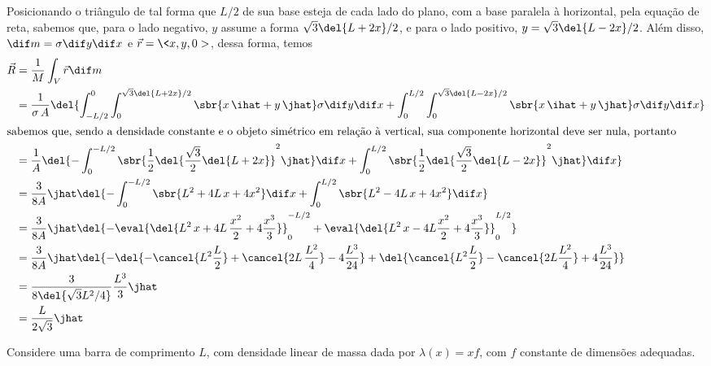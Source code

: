\documentclass[]{IMTexam}
\begin{document}
\begin{questions}
\begin{solution}
		Posicionando o triângulo de tal forma que $ L/2 $ de sua base esteja de cada lado do plano, com a base paralela à horizontal, pela equação de reta, sabemos que, para o lado negativo, $ y $ assume a forma $ \sqrt{3}\del{L+2x}/2 $, e para o lado positivo, $ y=\sqrt{3}\del{L-2x}/2 $. Além disso, $ \dif m=\sigma \dif y\dif x $ e $ \vec{r}=\<x,y,0> $, dessa forma, temos
		\begin{align*}
			\vec{R} & =\dfrac{1}{M}\int_{V}\vec{r}\dif m                                                                                                                                                                        \\
			        & =\dfrac{1}{\sigma\,A}\del{\int_{-L/2}^{0}\int_{0}^{\sqrt{3}\del{L+2x}/2}\sbr{x\,\ihat+y\,\jhat}\sigma\dif y\dif x+\int_{0}^{L/2}\int_{0}^{\sqrt{3}\del{L-2x}/2}\sbr{x\,\ihat+y\,\jhat}\sigma\dif y\dif x} \\
			\intertext{sabemos que, sendo a densidade constante e o objeto simétrico em relação à vertical, sua componente horizontal deve ser nula, portanto}
			        & =\dfrac{1}{A}\del{-\int_{0}^{-L/2}\sbr{\dfrac{1}{2}\del{\dfrac{\sqrt{3}}{2}\del{L+2x}}^{2}\jhat}\dif x+\int_{0}^{L/2}\sbr{\dfrac{1}{2}\del{\dfrac{\sqrt{3}}{2}\del{L-2x}}^{2}\jhat}\dif x}                \\
			        & =\dfrac{3}{8A}\jhat\del{-\int_{0}^{-L/2}\sbr{L^{2}+4L\,x+4x^{2}}\dif x+\int_{0}^{L/2}\sbr{L^{2}-4L\,x+4x^{2}}\dif x}                                                                                      \\
			        & =\dfrac{3}{8A}\jhat\del{-\eval{\del{L^{2}\,x+4L\,\dfrac{x^{2}}{2}+4\dfrac{x^{3}}{3}}}_{0}^{-L/2}+\eval{\del{L^{2}\,x-4L\dfrac{x^{2}}{2}+4\dfrac{x^{3}}{3}}}_{0}^{L/2}}                                    \\
			        & =\dfrac{3}{8A}\jhat\del{-\del{-\cancel{L^{2}\dfrac{L}{2}}+\cancel{2L\,\dfrac{L^{2}}{4}}-4\dfrac{L^{3}}{24}}+\del{\cancel{L^{2}\dfrac{L}{2}}-\cancel{2L\dfrac{L^{2}}{4}}+4\dfrac{L^{3}}{24}}}              \\
			        & =\dfrac{3}{8\del{\sqrt{3}L^{2}/4}}\dfrac{L^{3}}{3}\jhat                                                                                                                                                   \\
			        & =\dfrac{L}{2\sqrt{3}}\jhat
		\end{align*}
	\end{solution}

	\question Considere uma barra de comprimento $ L $, com densidade linear de massa dada por $ \lambda (x) = xf $, com $ f $ constante de dimensões adequadas.


\end{questions}
\end{document}
